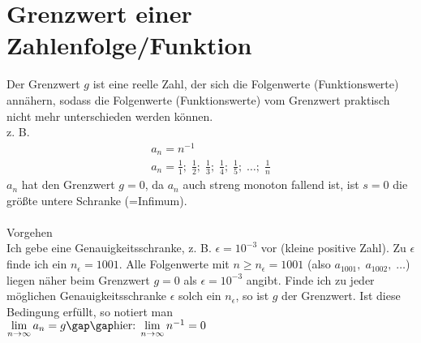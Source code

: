 \section{Grenzwert einer Zahlenfolge/Funktion}
Der Grenzwert $g$ ist eine reelle Zahl, der sich die Folgenwerte (Funktionswerte) annähern, sodass die Folgenwerte (Funktionswerte) vom Grenzwert praktisch nicht mehr unterschieden werden können. \\
z. B.
\begin{gather*}
  a_n = n^{-1} \\
  a_n = \frac{1}{1};\; \frac{1}{2};\; \frac{1}{3};\; \frac{1}{4};\; \frac{1}{5};\; \dots;\; \frac{1}{n}
\end{gather*}
$a_n$ hat den Grenzwert $g = 0$, da $a_n$ auch streng monoton fallend ist, ist $s = 0$ die größte untere Schranke (=\glqq Infimum\grqq). \\\\
Vorgehen \\
Ich gebe eine Genauigkeitsschranke, z. B. $\epsilon = 10^{-3}$ vor (kleine positive Zahl). Zu $\epsilon$ finde ich ein $n_\epsilon = 1001$. Alle Folgenwerte mit $n \geq n_\epsilon = 1001$ (also $a_{1001},\; a_{1002},\; \dots$) liegen näher beim Grenzwert $g = 0$ als $\epsilon = 10^{-3}$ angibt. Finde ich zu jeder möglichen Genauigkeitsschranke $\epsilon$ solch ein $n_\epsilon$, so ist $g$ der Grenzwert. Ist diese Bedingung erfüllt, so notiert man \\
$\lim\limits_{n \to \infty} a_n = g\gap\gap \text{hier:}\; \lim\limits_{n \to \infty} n^{-1} = 0$
